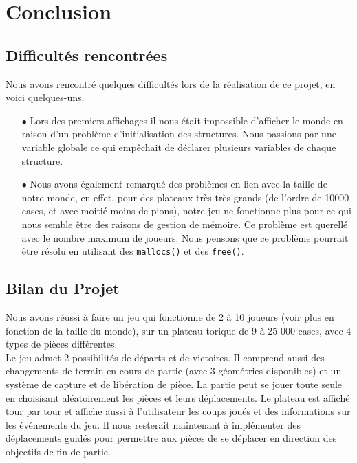 \chapter{Conclusion}

\section{Difficultés rencontrées}
    Nous avons rencontré quelques difficultés lors de la réalisation de ce projet, en voici quelques-uns.
    \medbreak
    \begin{itemize}
        \item[$\bullet$] Lors des premiers affichages il nous était impossible d'afficher le monde en raison d'un problème d'initialisation des structures. Nous passions par une variable globale ce qui empêchait de déclarer plusieurs variables de chaque structure.
        \medbreak
        \item[$\bullet$] Nous avons également remarqué des problèmes en lien avec la taille de notre monde, en effet, pour des plateaux très très grands (de l'ordre de 10000 cases, et avec moitié moins de pions), notre jeu ne fonctionne plus pour ce qui nous semble être des raisons de gestion de mémoire. Ce problème est querellé avec le nombre maximum de joueurs. Nous pensons que ce problème pourrait être résolu en utilisant des \texttt{mallocs()} et des \texttt{free()}. 
    \end{itemize}

\section{Bilan du Projet}
    Nous avons réussi à faire un jeu qui fonctionne de 2 à 10 joueurs (voir plus en fonction de la taille du monde), sur un plateau torique de 9 à 25 000 cases, avec 4 types de pièces différentes.\\
    Le jeu admet 2 possibilités de départs et de victoires. Il comprend aussi des changements de terrain en cours de partie (avec 3 géométries disponibles) et un système de capture et de libération de pièce. La partie peut se jouer toute seule en choisisant aléatoirement les pièces et leurs déplacements. Le plateau est affiché tour par tour et affiche aussi à l'utilisateur les coups joués et des informations sur les événements du jeu.
    \medbreak
    \noindent Il nous resterait maintenant à implémenter des déplacements guidés pour permettre aux pièces de se déplacer en direction des objectifs de fin de partie.
    
